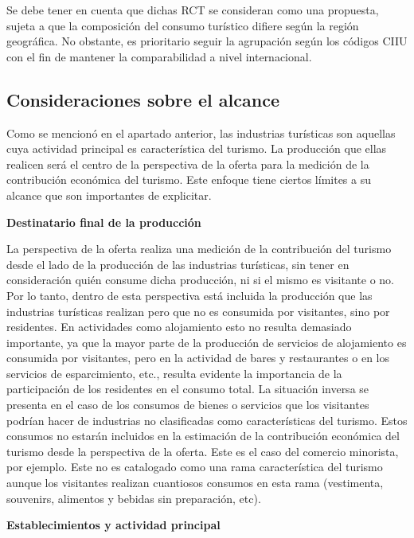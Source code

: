 \documentclass[
  openany]{book}
\begin{document}
Se debe tener en cuenta que dichas RCT se consideran como una propuesta, sujeta a que la composición del consumo turístico difiere según la región geográfica. No obstante, es prioritario seguir la agrupación según los códigos CIIU con el fin de mantener la comparabilidad a nivel internacional.

\hypertarget{consideraciones-sobre-el-alcance}{%
\subsection{Consideraciones sobre el alcance}\label{consideraciones-sobre-el-alcance}}

Como se mencionó en el apartado anterior, las industrias turísticas son aquellas cuya actividad principal es característica del turismo. La producción que ellas realicen será el centro de la perspectiva de la oferta para la medición de la contribución económica del turismo. Este enfoque tiene ciertos límites a su alcance que son importantes de explicitar.

\textbf{Destinatario final de la producción}

La perspectiva de la oferta realiza una medición de la contribución del turismo desde el lado de la producción de las industrias turísticas, sin tener en consideración quién consume dicha producción, ni si el mismo es visitante o no. Por lo tanto, dentro de esta perspectiva está incluida la producción que las industrias turísticas realizan pero que no es consumida por visitantes, sino por residentes. En actividades como alojamiento esto no resulta demasiado importante, ya que la mayor parte de la producción de servicios de alojamiento es consumida por visitantes, pero en la actividad de bares y restaurantes o en los servicios de esparcimiento, etc., resulta evidente la importancia de la participación de los residentes en el consumo total. La situación inversa se presenta en el caso de los consumos de bienes o servicios que los visitantes podrían hacer de industrias no clasificadas como características del turismo. Estos consumos no estarán incluidos en la estimación de la contribución económica del turismo desde la perspectiva de la oferta. Este es el caso del comercio minorista, por ejemplo. Este no es catalogado como una rama característica del turismo aunque los visitantes realizan cuantiosos consumos en esta rama (vestimenta, souvenirs, alimentos y bebidas sin preparación, etc).

\textbf{Establecimientos y actividad principal}
\end{document}
